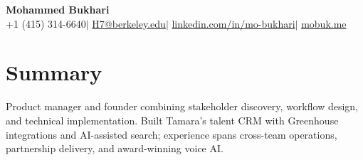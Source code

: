\documentclass[a4paper,10pt]{article}
\begin{document}
\begin{center}
  {\LARGE\bfseries Mohammed Bukhari}\\[3pt]
  +1 (415) 314-6640\enspace$|$\enspace
  \href{mailto:H7@berkeley.edu}{H7@berkeley.edu}\enspace$|$\enspace
  \href{https://www.linkedin.com/in/mo-bukhari/}{linkedin.com/in/mo-bukhari}\enspace$|$\enspace
  \href{https://mobuk.me}{mobuk.me}
\end{center}
\vspace{-5pt}

\section{Summary}
Product manager and founder combining stakeholder discovery, workflow design, and technical implementation. Built Tamara's talent CRM with Greenhouse integrations and AI-assisted search; experience spans cross-team operations, partnership delivery, and award-winning voice AI.
\end{document}
